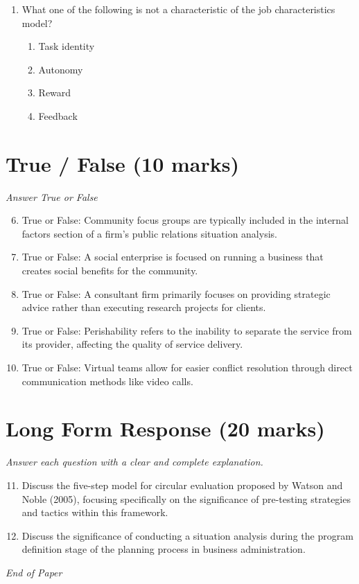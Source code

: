 \documentclass[12pt]{article}
\begin{document}
\begin{enumerate}[label=\arabic*.]
\begin{enumerate}[label=(\alph*)]
    \item Legal environment.
    \item Economic environment.
    \item Ecological environment.
\end{enumerate}
\item What one of the following is not a characteristic of the job characteristics model?
\begin{enumerate}[label=(\alph*)]
    \item Task identity
    \item Autonomy
    \item Reward
    \item Feedback
\end{enumerate}
\end{enumerate}

\section*{True / False (10 marks)}
\textit{Answer True or False}
\begin{enumerate}[label=\arabic*.]
\setcounter{enumi}{5}
\item True or False: Community focus groups are typically included in the internal factors section of a firm's public relations situation analysis.
\item True or False: A social enterprise is focused on running a business that creates social benefits for the community.
\item True or False: A consultant firm primarily focuses on providing strategic advice rather than executing research projects for clients.
\item True or False: Perishability refers to the inability to separate the service from its provider, affecting the quality of service delivery.
\item True or False: Virtual teams allow for easier conflict resolution through direct communication methods like video calls.
\end{enumerate}

\section*{Long Form Response (20 marks)}
\textit{Answer each question with a clear and complete explanation.}
\begin{enumerate}[label=\arabic*.]
\setcounter{enumi}{10}
\item Discuss the five-step model for circular evaluation proposed by Watson and Noble (2005), focusing specifically on the significance of pre-testing strategies and tactics within this framework.
\item Discuss the significance of conducting a situation analysis during the program definition stage of the planning process in business administration.
\end{enumerate}

\vfill
\noindent\textit{End of Paper}
\end{document}
